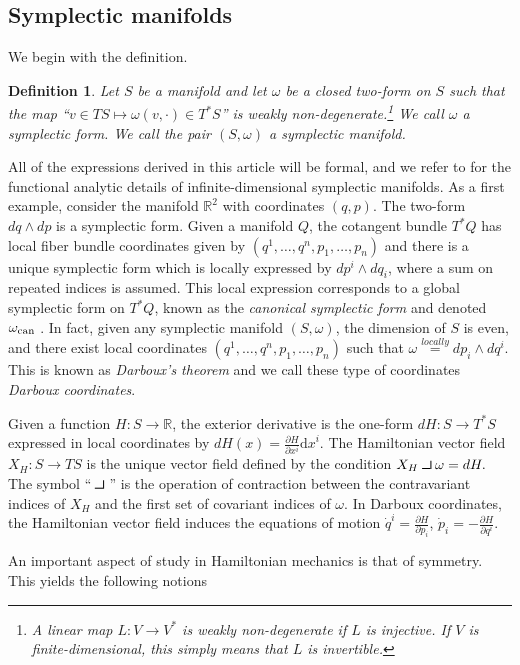 \documentclass[12pt]{amsart}
\newcommand{\pder}[2]{\ensuremath{\frac{\partial #1}{\partial #2}}}
\newcommand{\R}{\ensuremath{\mathbb{R}}}
\newcommand{\dx}{\ensuremath{\textrm{d}x}}
\def\contract{\makebox[1.2em][c]{\mbox{\rule{.6em}
{.01truein}\rule{.01truein}{.6em}}}}
\newtheorem{defn}[thm]{Definition}
\begin{document}
\subsection{Symplectic manifolds}
\label{sec:Symplectic}
We begin with the definition.
\begin{defn}
  Let $S$ be a manifold
  and let $\omega$ be a closed two-form on $S$ such that the map
  ``$v \in TS \mapsto \omega( v , \cdot ) \in T^*S$'' is weakly non-degenerate.\footnote{
    A linear map $L:V \to V^*$ is \emph{weakly non-degenerate} if $L$ is injective.  If $V$ is finite-dimensional, this simply means that $L$ is invertible.}
  We call $\omega$ a \emph{symplectic form}.
  We call the pair $(S,\omega)$ a \emph{symplectic manifold}.
\end{defn}
All of the expressions derived in this article will be formal, and we refer to \cite{GayBalmazVizman2012}
for the functional analytic details of infinite-dimensional symplectic manifolds.
As a first example, consider the manifold $\R^2$
with coordinates $(q,p)$.
The two-form $dq \wedge dp$ is a symplectic form.
Given a manifold $Q$,
the cotangent bundle $T^*Q$ has local fiber bundle coordinates
given by $(q^1,\dots, q^n,p_1,\dots,p_n)$ and there is a unique symplectic form
which is locally expressed by $dp^i \wedge dq_i$, where
a sum on repeated indices is assumed.
This local expression corresponds to a global symplectic
form on $T^*Q$, known as the \emph{canonical symplectic form}
and denoted $\omega_{\rm can}$ \cite[Theorem 3.2.10]{FOM}.
In fact, given any symplectic manifold $(S,\omega)$, the dimension of $S$
is even, and there exist local coordinates $(q^1,\dots,q^n,p_1,\dots,p_n)$
such that $\omega \stackrel{locally}{=} dp_i \wedge dq^i$.
This is known as \emph{Darboux's theorem} and we call these type of
coordinates \emph{Darboux coordinates}\cite[Theorem 3.2.2]{FOM}.

Given a function $H:S \to \mathbb{R}$,
the exterior derivative is the one-form $dH:S \to T^*S$
expressed in local coordinates by $dH(x) = \pder{H}{x^i} \dx^i$.
The Hamiltonian vector field $X_H:S \to TS$ is the unique vector
field defined by the condition
$
  X_H \contract \omega = dH.
$
The symbol ``$\contract$'' is the operation of contraction between
the contravariant indices of $X_H$ and the first set of covariant
indices of $\omega$.
In Darboux coordinates, the Hamiltonian vector field induces the
equations of motion $\dot{q}^i = \pder{H}{p_i}$, $\dot{p}_i = -\pder{H}{q^i}$.


An important aspect of study in Hamiltonian mechanics is that of symmetry.
This yields the following notions
\end{document}
